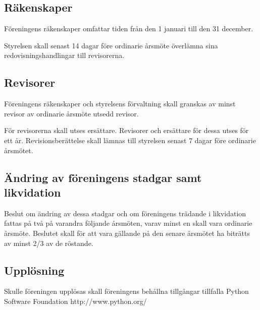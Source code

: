 \documentclass[11pt, a4paper]{article}
\begin{document}
\subsection{Räkenskaper}
Föreningens räkenskaper omfattar tiden från den 1 januari till den 31 december.

Styrelsen skall senast 14 dagar före ordinarie årsmöte överlämna sina redovisningshandlingar
till revisorerna.

\subsection{Revisorer}
Föreningens räkenskaper och styrelsens förvaltning skall granskas av minst revisor av ordinarie årsmöte utsedd revisor.

För revisorerna skall utses ersättare. Revisorer och ersättare för dessa utses för ett år. Revisionsberättelse skall lämnas till styrelsen senast 7 dagar före ordinarie årsmötet.

\subsection{Ändring av föreningens stadgar samt likvidation}
Beslut om ändring av dessa stadgar och om föreningens trädande i likvidation fattas på två på varandra följande årsmöten, varav minst en skall vara ordinarie årsmöte. Beslutet skall för att vara gällande på den senare årsmötet ha biträtts av minst 2/3 av de röstande.

\subsection{Upplösning}
Skulle föreningen upplösas skall föreningens behållna tillgångar tillfalla Python Software Foundation http://www.python.org/
\end{document}
